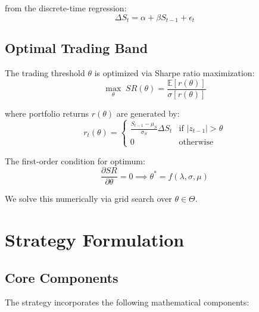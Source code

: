 \documentclass[article]{arithmaxresearch}
\begin{document}
from the discrete-time regression:
\begin{equation}
\Delta S_t = \alpha + \beta S_{t-1} + \epsilon_t
\end{equation}

\subsection{Optimal Trading Band}

The trading threshold $\theta$ is optimized via Sharpe ratio maximization:
\begin{equation}
\max_{\theta} \; SR(\theta) = \frac{\mathbb{E}[r(\theta)]}{\sigma[r(\theta)]}
\end{equation}

where portfolio returns $r(\theta)$ are generated by:
\begin{equation}
r_t(\theta) = \begin{cases} 
\frac{S_{t-1} - \mu_S}{\sigma_S} \Delta S_t & \text{if } |z_{t-1}| > \theta \\
0 & \text{otherwise}
\end{cases}
\end{equation}

The first-order condition for optimum:
\begin{equation}
\frac{\partial SR}{\partial \theta} = 0 \implies \theta^* = f(\lambda, \sigma, \mu)
\end{equation}

We solve this numerically via grid search over $\theta \in \Theta$.

\section{Strategy Formulation}

\subsection{Core Components}

The strategy incorporates the following mathematical components:
\end{document}
